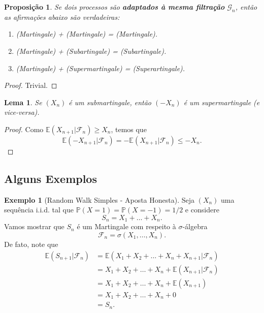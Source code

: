 \documentclass[12pt,a4paper,oneside]{book}
\newtheorem{proposition}[theorem]{Proposi\c{c}\~ao}
\newtheorem{lemma}[theorem]{Lema}
\theoremstyle{definition}
\newtheorem{example}[theorem]{Exemplo}
\theoremstyle{remark}
\numberwithin{equation}{section}
\newcommand{\E}{\mathbb{E}}
\newcommand{\pr}{\mathbb{P}}
\newcommand{\F}{\mathcal{F}}
\begin{document}
\begin{proposition}
Se dois processos são \textbf{adaptados à mesma filtração} $\mathcal{G}_n$, então as afirmações abaixo são verdadeiras:
\begin{enumerate}
\item (Martingale) + (Martingale) = (Martingale).
\item (Martingale) + (Subartingale) = (Subartingale).
\item (Martingale) + (Supermartingale) = (Superartingale).
\end{enumerate}
\end{proposition}

\begin{proof}
Trivial.
\end{proof}


\begin{lemma}
Se $(X_n)$ é um submartingale, então $(-X_n)$ é um supermartingale (e vice-versa).
\end{lemma}
\begin{proof}
Como $\E(X_{n+1}|\F_n)\geq X_n$, temos que 
$$\E(-X_{n+1}|\F_n) = - \E(X_{n+1}|\F_n)\leq -X_n. $$
\end{proof}


\subsection{Alguns Exemplos}


\begin{example}[Random Walk Simples - Aposta Honesta] Seja $(X_n)$ uma sequência i.i.d. tal que  $\pr(X=1) = \pr(X=-1)=1/2$ e considere 
$$S_n = X_1+\dots + X_n. $$
Vamos mostrar que $S_n$ é um Martingale com respeito à $\sigma$-álgebra 
$$\mathcal{F}_n = \sigma(X_1,\dots, X_n). $$ 
De fato, note que
\begin{align*}
\E(S_{n+1}|\mathcal{F}_n) &= \E(X_1+X_2+\dots + X_n+X_{n+1}|\mathcal{F}_n)\\
&= X_1 + X_2 + \dots + X_ n + \E(X_{n+1}|\mathcal{F}_n)\\
& =  X_1 + X_2 + \dots + X_ n + \E(X_{n+1})\\
& =  X_1 + X_2 + \dots + X_ n + 0\\
& = S_n.
\end{align*}

\end{example}
\end{document}
